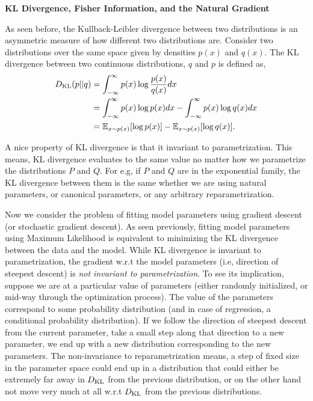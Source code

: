 
\newcommand{\argminE}{\mathop{\mathrm{argmin}}\limits}          %
\newcommand{\argmaxE}{\mathop{\mathrm{argmax}}\limits}          %

\clearpage

\item {} {\bf KL Divergence, Fisher Information, and the Natural Gradient}

As seen before, the Kullback-Leibler divergence between two distributions is an asymmetric measure of how different two distributions are. Consider two distributions over the same space given by densities $p(x)$ and $q(x)$. The KL divergence between two continuous distributions, $q$ and $p$ is defined as,
 \begin{align*}
D_{\text{KL}}(p||q)&=\int_{-\infty}^{\infty}p(x)\log\dfrac{p(x)}{q(x)}dx\\
&=\int_{-\infty}^{\infty}p(x)\log p(x)dx-\int_{-\infty}^{\infty}p(x)\log q(x)dx\\
&=\mathbb{E}_{x\sim p(x)}[\log p(x)]-\mathbb{E}_{x\sim p(x)}[\log q(x)].
\end{align*}


A nice property of KL divergence is that it invariant to parametrization. This means, KL divergence
evaluates to the same value no matter how we parametrize the distributions $P$ and $Q$. For e.g,
if $P$ and $Q$ are in the exponential family, the KL divergence between them is the same whether
we are using natural parameters, or canonical parameters, or any arbitrary reparametrization.


Now we consider the problem of fitting model parameters using gradient descent (or stochastic gradient
descent). As seen previously, fitting model parameters using Maximum Likelihood is equivalent
to minimizing the KL divergence between the data and the model. While KL divergence is
invariant to parametrization, the gradient w.r.t the model parameters (i.e, direction
of steepest descent) is \emph{not invariant to parametrization}. To see its implication, suppose
we are at a particular value of parameters (either randomly initialized, or mid-way through
the optimization process). The value of the parameters correspond to some probability distribution
(and in case of regression, a conditional probability distribution).
If we follow the direction of steepest descent from the current parameter, take a small step along that
direction to a new parameter, we end up with a new distribution corresponding to the new parameters.
The non-invariance to reparametrization means, a step of fixed size in the parameter space could
end up in a distribution that could either be extremely far away in $D_{\text{KL}}$ from the previous
distribution, or on the other hand not move very much at all w.r.t $D_{\text{KL}}$ from the previous
distributions.


